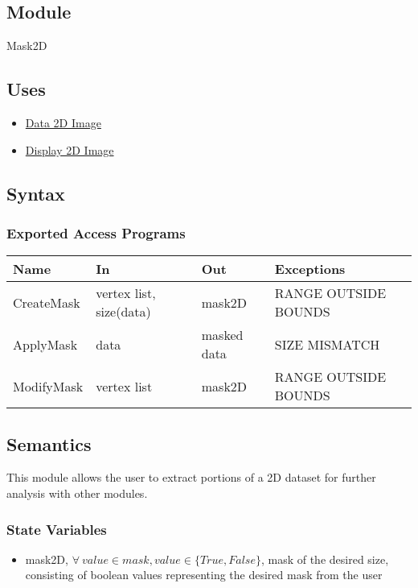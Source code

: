 \documentclass[12pt, titlepage]{article}
\begin{document}
\subsection{Module}

Mask2D

\subsection{Uses}
\begin{itemize}
    \item \hyperref[Mod:Image]{Data 2D Image}
    \item \hyperref[Mod:Disp2D]{Display 2D Image}
\end{itemize}

\subsection{Syntax}

\subsubsection{Exported Access Programs}

\begin{center}
    \begin{tabular}{p{3cm} p{4cm} p{4cm} p{3cm}}
        \hline
        \textbf{Name} & \textbf{In} & \textbf{Out} & \textbf{Exceptions} \\
        \hline
        CreateMask & vertex list, size(data) & mask2D & RANGE OUTSIDE BOUNDS \\
        ApplyMask & data & masked data & SIZE MISMATCH\\
        ModifyMask & vertex list & mask2D & RANGE OUTSIDE BOUNDS \\
        \hline
    \end{tabular}
\end{center}

\subsection{Semantics}
This module allows the user to extract portions of a 2D dataset for further
analysis with other modules.

\subsubsection{State Variables}
\begin{itemize}
    \item mask2D, $\forall\ value \in mask, value \in \{True,False\}$, mask of
    the desired size, consisting of boolean values representing the desired mask
    from the user
\end{itemize}
\end{document}
